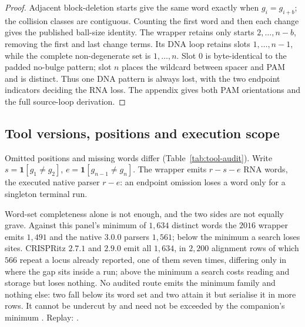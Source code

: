 \begin{proof}
Adjacent block-deletion starts give the same word exactly when $g_i=g_{i+b}$;
the collision classes are contiguous. Counting the first word and then each change
gives the published ball-size identity. The wrapper retains only starts
$2,\ldots,n-b$, removing the first and last change terms. Its DNA loop retains
slots $1,\ldots,n-1$, while the complete non-degenerate set is $1,\ldots,n$.
Slot $0$ is byte-identical to the padded no-bulge pattern; slot $n$ places the
wildcard between spacer and PAM and is distinct. Thus one DNA pattern is always
lost, with the two endpoint indicators deciding the RNA loss. The appendix gives
both PAM orientations and the full source-loop derivation.
\end{proof}

\subsection{Tool versions, positions and execution scope}
\label{ssec:tool-audit}
Omitted positions and missing words differ (Table~\ref{tab:tool-audit}). Write
$s=\mathbf{1}[g_1\ne g_2]$, $e=\mathbf{1}[g_{n-1}\ne g_n]$.
The wrapper emits $r-s-e$ RNA words, the executed native parser $r-e$:
an endpoint omission loses a word only for a singleton terminal run.

Word-set completeness alone is not enough, and the two sides are not equally grave.
Against this panel's minimum of $1{,}634$ distinct words the $2016$ wrapper emits $1{,}491$ and
the native $3.0.0$ parsers $1{,}561$; below the minimum a search loses sites. CRISPRitz $2.7.1$
and $2.9.0$ emit all $1{,}634$, in $2{,}200$ alignment rows of which $566$ repeat a locus already
reported, one of them seven times, differing only in where the gap sits inside a run; above the
minimum a search costs reading and storage but loses nothing. No audited route emits the minimum
family and nothing else: two fall below its word set and two attain it but serialise it in more
rows. It cannot be undercut by  and need not be exceeded by the companion's
minimum \citep{companion_reach}. Replay: .

